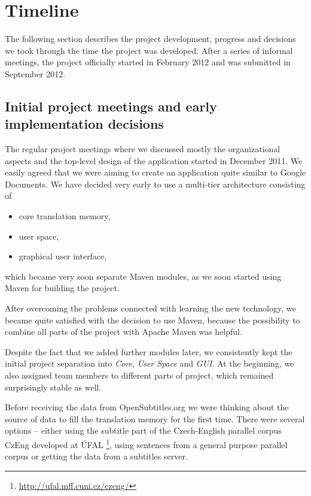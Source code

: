 \section{Timeline}

The following section describes the project development, progress and decisions we took through the time the project was developed. After a series of informal meetings, the project officially started in February 2012 and was submitted in September 2012.

\subsection{Initial project meetings and early implementation decisions}

The regular project meetings where we discussed mostly the organizational aspects and the top-level design of the application started in December 2011. We easily agreed that we were aiming to create an application quite similar to Google Documents. We have decided very early to use a multi-tier architecture consisting of

\begin{itemize}
\item core translation memory,
\item user space,
\item graphical user interface,
\end{itemize}

which became very soon separate Maven modules, as we soon started using Maven for building the project.

After overcoming the problems connected with learning the new technology, we became quite satisfied with the decision to use Maven, because the possibility to combine all parts of the project with Apache Maven was helpful.

Despite the fact that we added further modules later, we consistently kept the initial project separation into \emph{Core}, \emph{User Space} and \emph{GUI}. At the beginning, we also assigned team members to different parts of project, which remained surprisingly stable as well.

Before receiving the data from OpenSubtitles.org we were thinking about the source of data to fill the translation memory for the first time. There were several options -- either using the subtitle part of the Czech-English parallel corpus CzEng developed at ÚFAL \footnote{\url{http://ufal.mff.cuni.cz/czeng/}}, using sentences from a general purpose parallel corpus or getting the data from a subtitles server.

